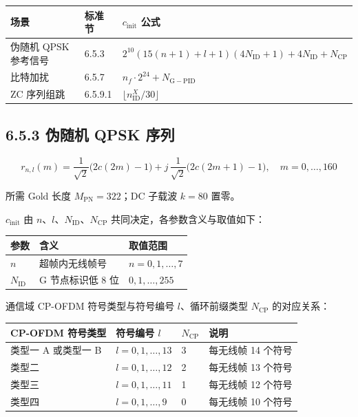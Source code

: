 \documentclass[11pt,a4paper]{ctexart}
\begin{document}
\begin{table}[h]
\centering
\small
\begin{tabular}{lll}
\toprule
\textbf{场景} & \textbf{标准节} & \textbf{$c_{\mathrm{init}}$ 公式} \\
\midrule
伪随机 QPSK 参考信号 & 6.5.3 & $2^{10}(15(n{+}1){+}l{+}1)(4N_{\mathrm{ID}}{+}1){+}4N_{\mathrm{ID}}{+}N_{\mathrm{CP}}$ \\
比特加扰 & 6.5.7 & $n_f\cdot 2^{24} + N_{\mathrm{G-PID}}$ \\
ZC 序列组跳 & 6.5.9.1 & $\lfloor n_{\mathrm{ID}}^X / 30\rfloor$ \\
\bottomrule
\end{tabular}
\end{table}

\subsection{6.5.3 伪随机 QPSK 序列}

\begin{equation}
r_{n,l}(m) = \frac{1}{\sqrt{2}}\bigl(2c(2m)-1\bigr) + j\,\frac{1}{\sqrt{2}}\bigl(2c(2m{+}1)-1\bigr), \quad m=0,\ldots,160
\end{equation}

所需 Gold 长度 $M_{\mathrm{PN}}=322$；DC 子载波 $k{=}80$ 置零。

$c_{\mathrm{init}}$ 由 $n$、$l$、$N_{\mathrm{ID}}$、$N_{\mathrm{CP}}$ 共同决定，各参数含义与取值如下：

\begin{table}[h]
\centering
\small
\begin{tabular}{p{2.5cm}p{4.5cm}p{7cm}}
\toprule
\textbf{参数} & \textbf{含义} & \textbf{取值范围} \\
\midrule
$n$ & 超帧内无线帧号 & $n = 0, 1, \ldots, 7$ \\
$N_{\mathrm{ID}}$ & G 节点标识低 8 位 & $0, 1, \ldots, 255$ \\
\bottomrule
\end{tabular}
\end{table}

通信域 CP-OFDM 符号类型与符号编号 $l$、循环前缀类型 $N_{\mathrm{CP}}$ 的对应关系：

\begin{table}[h]
\centering
\small
\begin{tabular}{p{4.8cm}p{3.8cm}p{1.8cm}p{3.6cm}}
\toprule
\textbf{CP-OFDM 符号类型} & \textbf{符号编号 $l$} & \textbf{$N_{\mathrm{CP}}$} & \textbf{说明} \\
\midrule
类型一 A 或类型一 B & $l = 0, 1, \ldots, 13$ & 3 & 每无线帧 14 个符号 \\
类型二 & $l = 0, 1, \ldots, 12$ & 2 & 每无线帧 13 个符号 \\
类型三 & $l = 0, 1, \ldots, 11$ & 1 & 每无线帧 12 个符号 \\
类型四 & $l = 0, 1, \ldots, 9$ & 0 & 每无线帧 10 个符号 \\
\bottomrule
\end{tabular}
\end{table}
\end{document}
